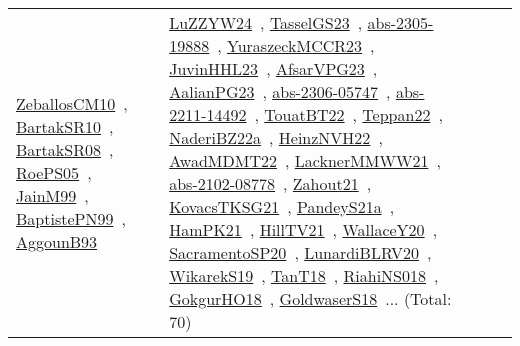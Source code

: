 {\begin{longtable}{lp{3cm}>{\raggedright\arraybackslash}p{6cm}>{\raggedright\arraybackslash}p{6cm}>{\raggedright\arraybackslash}p{8cm}}
\href{../works/ZeballosCM10.pdf}{ZeballosCM10}~\cite{ZeballosCM10}, \href{../works/BartakSR10.pdf}{BartakSR10}~\cite{BartakSR10}, \href{../works/BartakSR08.pdf}{BartakSR08}~\cite{BartakSR08}, \href{../works/RoePS05.pdf}{RoePS05}~\cite{RoePS05}, \href{../works/JainM99.pdf}{JainM99}~\cite{JainM99}, \href{../works/BaptistePN99.pdf}{BaptistePN99}~\cite{BaptistePN99}, \href{../works/AggounB93.pdf}{AggounB93}~\cite{AggounB93} & \href{../works/LuZZYW24.pdf}{LuZZYW24}~\cite{LuZZYW24}, \href{../works/TasselGS23.pdf}{TasselGS23}~\cite{TasselGS23}, \href{../works/abs-2305-19888.pdf}{abs-2305-19888}~\cite{abs-2305-19888}, \href{../works/YuraszeckMCCR23.pdf}{YuraszeckMCCR23}~\cite{YuraszeckMCCR23}, \href{../works/JuvinHHL23.pdf}{JuvinHHL23}~\cite{JuvinHHL23}, \href{../works/AfsarVPG23.pdf}{AfsarVPG23}~\cite{AfsarVPG23}, \href{../works/AalianPG23.pdf}{AalianPG23}~\cite{AalianPG23}, \href{../works/abs-2306-05747.pdf}{abs-2306-05747}~\cite{abs-2306-05747}, \href{../works/abs-2211-14492.pdf}{abs-2211-14492}~\cite{abs-2211-14492}, \href{../works/TouatBT22.pdf}{TouatBT22}~\cite{TouatBT22}, \href{../works/Teppan22.pdf}{Teppan22}~\cite{Teppan22}, \href{../works/NaderiBZ22a.pdf}{NaderiBZ22a}~\cite{NaderiBZ22a}, \href{../works/HeinzNVH22.pdf}{HeinzNVH22}~\cite{HeinzNVH22}, \href{../works/AwadMDMT22.pdf}{AwadMDMT22}~\cite{AwadMDMT22}, \href{../works/LacknerMMWW21.pdf}{LacknerMMWW21}~\cite{LacknerMMWW21}, \href{../works/abs-2102-08778.pdf}{abs-2102-08778}~\cite{abs-2102-08778}, \href{../works/Zahout21.pdf}{Zahout21}~\cite{Zahout21}, \href{../works/KovacsTKSG21.pdf}{KovacsTKSG21}~\cite{KovacsTKSG21}, \href{../works/PandeyS21a.pdf}{PandeyS21a}~\cite{PandeyS21a}, \href{../works/HamPK21.pdf}{HamPK21}~\cite{HamPK21}, \href{../works/HillTV21.pdf}{HillTV21}~\cite{HillTV21}, \href{../works/WallaceY20.pdf}{WallaceY20}~\cite{WallaceY20}, \href{../works/SacramentoSP20.pdf}{SacramentoSP20}~\cite{SacramentoSP20}, \href{../works/LunardiBLRV20.pdf}{LunardiBLRV20}~\cite{LunardiBLRV20}, \href{../works/WikarekS19.pdf}{WikarekS19}~\cite{WikarekS19}, \href{../works/TanT18.pdf}{TanT18}~\cite{TanT18}, \href{../works/RiahiNS018.pdf}{RiahiNS018}~\cite{RiahiNS018}, \href{../works/GokgurHO18.pdf}{GokgurHO18}~\cite{GokgurHO18}, \href{../works/GoldwaserS18.pdf}{GoldwaserS18}~\cite{GoldwaserS18}... (Total: 70)\\

\end{longtable}}
